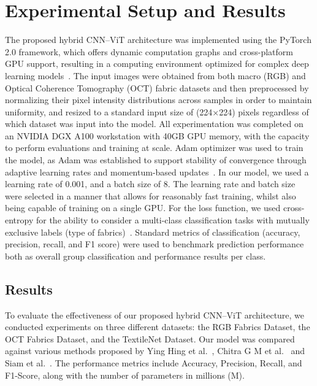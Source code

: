 \vspace{-1em}
\section{Experimental Setup and Results}

The proposed hybrid CNN–ViT architecture was implemented using the PyTorch 2.0 framework, which offers dynamic computation graphs and cross-platform GPU support, resulting in a computing environment optimized for complex deep learning models~\cite{paszke2019pytorch}. The input images were obtained from both macro (RGB) and Optical Coherence Tomography (OCT) fabric datasets and then preprocessed by normalizing their pixel intensity distributions across samples in order to maintain uniformity, and resized to a standard input size of (224×224) pixels regardless of which dataset was input into the model. All experimentation was completed on an NVIDIA DGX A100 workstation with 40GB GPU memory, with the capacity to perform evaluations and training at scale. Adam optimizer was used to train the model, as Adam was established to support stability of convergence through adaptive learning rates and momentum-based updates~\cite{kingma2014adam}. In our model, we used a learning rate of 0.001, and a batch size of 8. The learning rate and batch size were selected in a manner that allows for reasonably fast training, whilst also being capable of training on a single GPU. For the loss function, we used cross-entropy for the ability to consider a multi-class classification tasks with mutually exclusive labels (type of fabrics)~\cite{goodfellow2016deep}. Standard metrics of classification (accuracy, precision, recall, and F1 score) were used to benchmark prediction performance both as overall group classification and performance results per class.
\subsection{Results}

To evaluate the effectiveness of our proposed hybrid CNN–ViT architecture, we conducted experiments on three different datasets: the RGB Fabrics Dataset, the OCT Fabrics Dataset, and the TextileNet Dataset. Our model was compared against various methods proposed by Ying Hing et al.~\cite{hong2024research}, Chitra G M et al.~\cite{chitra2023fabric} and Siam et al.~\cite{siam2023textilenet}. The performance metrics include Accuracy, Precision, Recall, and F1-Score, along with the number of parameters in millions (M).

